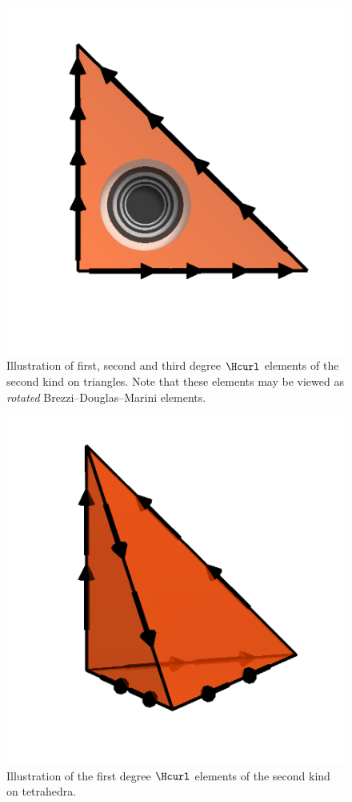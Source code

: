 \begin{figure}
  \includegraphics[width=\threefigs]{chapters/kirby-6/png/NED2_3_2d.png}
  \caption{Illustration of first, second and third degree \nedelec{}
    $\Hcurl$ elements of the second kind on triangles. Note that
    these elements may be viewed as \emph{rotated}
    Brezzi--Douglas--Marini elements.}
  \label{kirby-6:fig:ned2:tri}
\end{figure}

\begin{figure}
  \centering
  \includegraphics[width=\smallfig]{chapters/kirby-6/png/NED2_1_3d.png}
  \caption{Illustration of the first degree \nedelec{} $\Hcurl$
    elements of the second kind on tetrahedra.}
  \label{kirby-6:fig:ned2:tet}
\end{figure}

